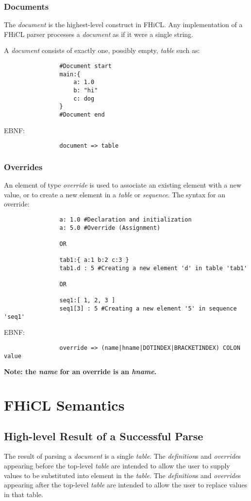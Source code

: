 \documentclass{memarticle}
\begin{document}
		\subsubsection{Documents}
			The \emph{document} is the highest-level construct 
			in FHiCL.
			Any implementation of a FHiCL parser
			processes a \emph{document}
			as if it were a single string.

			A \emph{document} consists of exactly one,
			possibly empty,
			\emph{table} such as:
			\begin{verbatim}
				#Document start
				main:{
					a: 1.0
					b: "hi"
					c: dog
				}
				#Document end
			\end{verbatim}	
			\vspace{1mm}
			EBNF:
			\begin{verbatim}
				document => table
			\end{verbatim}
			
		\subsubsection{Overrides}
			An element of type \emph{override} is used to associate 
			an existing element with a new value,
			or to create a new element in a \emph{table} or \emph{sequence}.
			The syntax for an override:
			\begin{verbatim}
				a: 1.0 #Declaration and initialization
				a: 5.0 #Override (Assignment)
				
				OR
				
				tab1:{ a:1 b:2 c:3 }
				tab1.d : 5 #Creating a new element 'd' in table 'tab1'
				
				OR
				
				seq1:[ 1, 2, 3 ]
				seq1[3] : 5 #Creating a new element '5' in sequence 'seq1'
			\end{verbatim}
			\vspace{1mm}
			EBNF:
			\begin{verbatim}
				override => (name|hname|DOTINDEX|BRACKETINDEX) COLON value
			\end{verbatim}	
			\bf Note: \rm the \emph{name} for an override 
			is an \emph{hname}.
			
\section{FHiCL Semantics}
	\subsection{High-level Result of a Successful Parse}
		The result of parsing a \emph{document}
		is a single \emph{table}.
		The \emph{definition}s and \emph{override}s
		appearing before the top-level \emph{table}
		are intended to allow the user
		to supply values to be substituted into element in the \emph{table}.
		The \emph{definition}s and \emph{override}s
		appearing after the top-level \emph{table}
		are intended to allow the user
		to replace values in that table.
\end{document}

